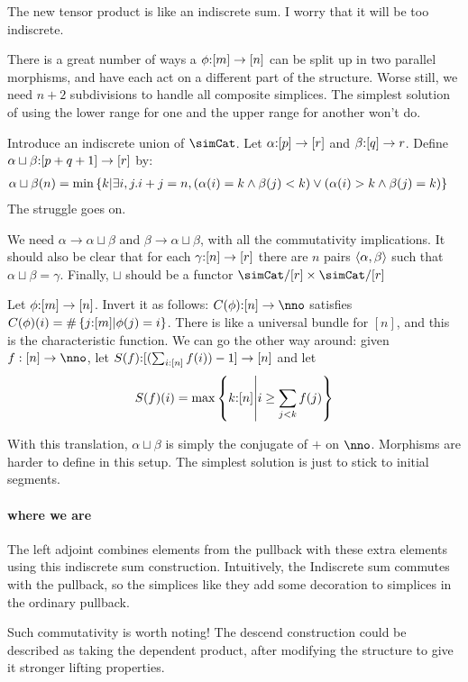 \documentclass[csh.tex]{subfiles}
\begin{document}
The new tensor product is like an indiscrete sum. I worry that it will be too indiscrete.

There is a great number of ways a $\phi\mathord :[m]\to[n]$ can be split up in two parallel morphisms, and have each act on a different part of the structure. Worse still, we need $n+2$ subdivisions to handle all composite simplices. The simplest solution of using the lower range for one and the upper range for another won't do.

Introduce an indiscrete union of $\simCat$.
Let $\alpha\mathord :[p]\to[r]$ and $\beta\mathord :[q]\to r$. Define
$\alpha\sqcup\beta\mathord :[p+q+1]\to [r]$ by:
\begin{align*}
\alpha\sqcup\beta(n) &= \min\left\{ k | \exists i,j. i + j = n, (\alpha(i) = k \land \beta(j) < k ) \lor (\alpha(i) > k \land \beta(j) = k )\right\}
\end{align*}
The struggle goes on.

We need $\alpha \to \alpha\sqcup\beta$ and $\beta \to \alpha\sqcup\beta$, with all the commutativity implications. It should also be clear that for each $\gamma\mathord :[n]\to [r]$ there are $n$ pairs $\left\langle \alpha,\beta \right\rangle$ such that $\alpha\sqcup\beta = \gamma$. Finally, $\sqcup$ should be a functor $\simCat/[r]\times\simCat/[r]$

Let $\phi\mathord : [m]\to [n]$. Invert it as follows: $C(\phi)\of [n]\to \nno$
satisfies $C(\phi)(i) = \#\left\{j\mathord : [m]|\phi(j) = i\right\}$. There is like a universal bundle for $[n]$, and this is the characteristic function.
We can go the other way around: given $f:[n]\to\nno$, let $S(f)\mathord :[(\sum_{i\mathord :[n]} f(i)) - 1] \to [n]$ and let 
\[S(f)(i) = \max\left\{ k\mathord :[n] \middle| i \geq \sum_{j < k} f(j) \right\}\]

With this translation, $\alpha\sqcup\beta$ is simply the conjugate of $+$ on $\nno$. Morphisms are harder to define in this setup. The simplest solution is just to stick to initial segments.

\paragraph{where we are}
The left adjoint combines elements from the pullback with these extra elements using this indiscrete sum construction. Intuitively, the Indiscrete sum commutes with the pullback, so the simplices like they add some decoration to simplices in the ordinary pullback.

Such commutativity is worth noting! The descend construction could be described as taking the dependent product, after modifying the structure to give it stronger lifting properties. 
\end{document}
